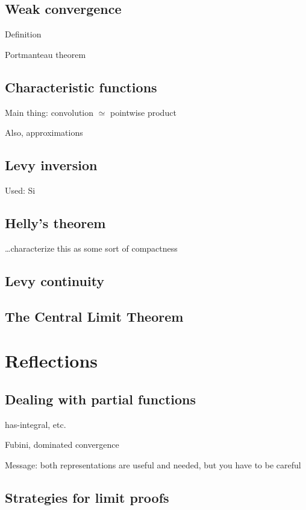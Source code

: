 \documentclass{svjour3}
\begin{document}
\subsection{Weak convergence}

Definition

Portmanteau theorem

\subsection{Characteristic functions}

Main thing: convolution $\simeq$ pointwise product

Also, approximations

\subsection{Levy inversion}

Used: Si

\subsection{Helly's theorem}

\ldots characterize this as some sort of compactness

\subsection{Levy continuity}


\subsection{The Central Limit Theorem}


\section{Reflections}
\label{section:reflections}

\subsection{Dealing with partial functions}

has-integral, etc.

Fubini, dominated convergence

Message: both representations are useful and needed, but you have to be careful

\subsection{Strategies for limit proofs}
\end{document}
